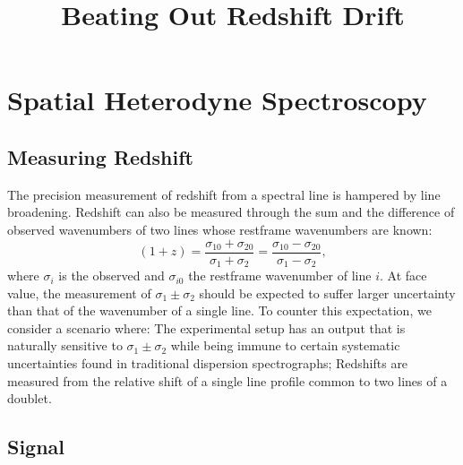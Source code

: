 \documentclass[preprint]{aastex}
\begin{document}
\title{Beating Out Redshift Drift}
\section{Spatial Heterodyne Spectroscopy}
\subsection{Measuring Redshift}
The precision measurement of redshift from a spectral line is hampered by line broadening. 
Redshift can also be measured through the sum and the difference of observed wavenumbers of two lines whose restframe wavenumbers are known:
\begin{equation}
(1+z)=\frac{\sigma_{10}+\sigma_{20}}{\sigma_{1}+\sigma_{2}}=\frac{\sigma_{10}-\sigma_{20}}{\sigma_{1}-\sigma_{2}},
\label{redshift:eqn}
\end{equation}
where $\sigma_i$ is the observed and $\sigma_{i0}$ the restframe wavenumber of line $i$.
At face value, the measurement of $\sigma_1\pm\sigma_2$ should be expected to suffer larger uncertainty than that of the wavenumber
of a single line.  To counter this expectation, we consider a scenario where: The experimental setup has an output that is naturally sensitive
to $\sigma_1\pm\sigma_2$ while being immune to certain systematic uncertainties found in traditional dispersion spectrographs;
Redshifts are measured from the relative shift of a single line profile common to two lines of a doublet.


\subsection{Signal}
\end{document}
